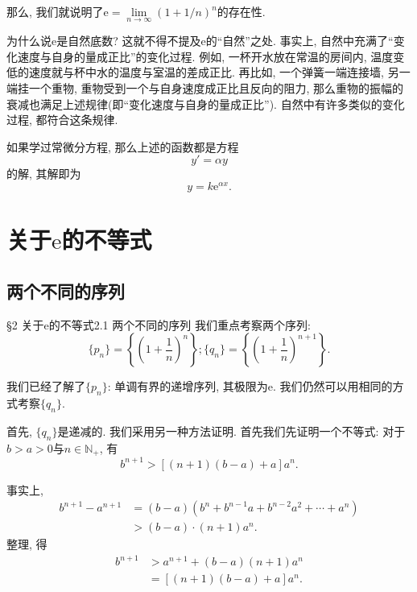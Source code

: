 \documentclass[serif]{beamer}
\begin{document}
\begin{frame}
	那么, 我们就说明了$\mathrm{e}=\lim\limits_{n\to\infty}(1+1/n)^n$的存在性.\par
	为什么说$\mathrm{e}$是自然底数? 这就不得不提及$\mathrm{e}$的“自然”之处. 事实上, 自然中充满了“变化速度与自身的量成正比”的变化过程. 例如, 一杯开水放在常温的房间内, 温度变低的速度就与杯中水的温度与室温的差成正比. 再比如, 一个弹簧一端连接墙, 另一端挂一个重物, 重物受到一个与自身速度成正比且反向的阻力, 那么重物的振幅的衰减也满足上述规律(即“变化速度与自身的量成正比”). 自然中有许多类似的变化过程, 都符合这条规律.\par
	如果学过常微分方程, 那么上述的函数都是方程
	\[y'=\alpha y\]
	的解, 其解即为
	\[y=k\mathrm{e}^{\alpha x}.\]
\end{frame}

\section{\heiti 关于$\mathrm{e}$的不等式}
\subsection{\kaishu 两个不同的序列}

\begin{frame}{\S2 关于$\mathrm{e}$的不等式}{2.1 两个不同的序列}
	我们重点考察两个序列:
	\[\{p_n\}=\left\{\left(1+\frac{1}{n}\right)^n\right\}; \{q_n\}=\left\{\left(1+\frac{1}{n}\right)^{n+1}\right\}.\]\par
	我们已经了解了$\{p_n\}$: 单调有界的递增序列, 其极限为$\mathrm{e}$. 我们仍然可以用相同的方式考察$\{q_n\}$.
\end{frame}

\begin{frame}
	首先, $\{q_n\}$是递减的. 我们采用另一种方法证明. 首先我们先证明一个不等式: 对于$b>a>0$与$n\in\mathbb{N}_+$, 有
	\[b^{n+1}>\left[(n+1)(b-a)+a\right]a^n.\]\par
	事实上, 
	\begin{align*}
		b^{n+1}-a^{n+1}&=(b-a)\left(b^n+b^{n-1}a+b^{n-2}a^2+\cdots+a^n\right)\\
		&>(b-a)\cdot(n+1)a^n.
	\end{align*}
	整理, 得
	\begin{align*}
		b^{n+1}&>a^{n+1}+(b-a)(n+1)a^n\\
		&=\left[(n+1)(b-a)+a\right]a^n.
	\end{align*}
\end{frame}
\end{document}
